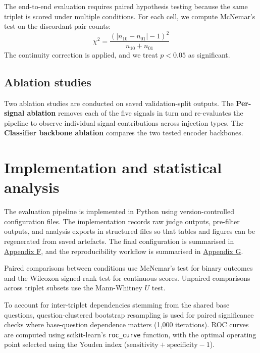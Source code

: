 The end-to-end evaluation requires paired hypothesis testing because the same triplet is scored under multiple conditions. For each cell, we compute McNemar's test on the discordant pair counts:
\begin{equation}
\chi^{2} = \frac{(|n_{10} - n_{01}| - 1)^{2}}{n_{10} + n_{01}}
\end{equation}
The continuity correction is applied, and we treat $p < 0.05$ as significant.

\subsection{Ablation studies}

Two ablation studies are conducted on saved validation-split outputs. The \textbf{Per-signal ablation} removes each of the five signals in turn and re-evaluates the pipeline to observe individual signal contributions across injection types. The \textbf{Classifier backbone ablation} compares the two tested encoder backbones.

\section{Implementation and statistical analysis}
\label{sec:implementation}

The evaluation pipeline is implemented in Python using version-controlled configuration files. The implementation records raw judge outputs, pre-filter outputs, and analysis exports in structured files so that tables and figures can be regenerated from saved artefacts. The final configuration is summarised in \hyperref[app:config]{Appendix F}, and the reproducibility workflow is summarised in \hyperref[app:reproducibility]{Appendix G}.

Paired comparisons between conditions use McNemar's test for binary outcomes and the Wilcoxon signed-rank test for continuous scores. Unpaired comparisons across triplet subsets use the Mann-Whitney $U$ test. 

To account for inter-triplet dependencies stemming from the shared base questions, question-clustered bootstrap resampling is used for paired significance checks where base-question dependence matters (1{,}000 iterations). ROC curves are computed using scikit-learn's \texttt{roc\_curve} function, with the optimal operating point selected using the Youden index ($\mathrm{sensitivity} + \mathrm{specificity} - 1$).
